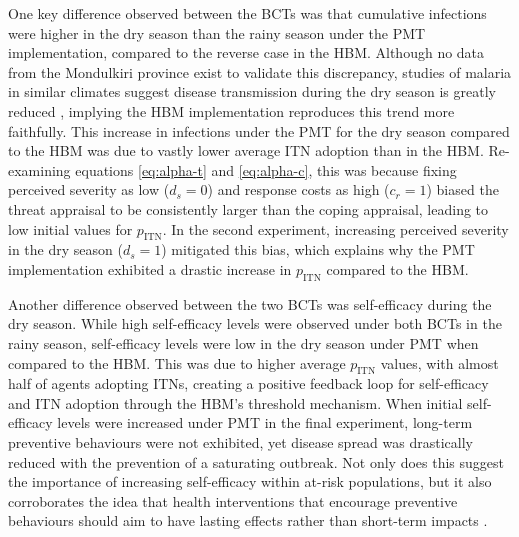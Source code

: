 One key difference observed between the BCTs was that cumulative infections were higher in the dry season than the rainy season under the PMT implementation, compared to the reverse case in the HBM. Although no data from the Mondulkiri province exist to validate this discrepancy, studies of malaria in similar climates suggest disease transmission during the dry season is greatly reduced \cite{stadler_evidence_2023}, implying the HBM implementation reproduces this trend more faithfully. This increase in infections under the PMT for the dry season compared to the HBM was due to vastly lower average ITN adoption than in the HBM. Re-examining equations \eqref{eq:alpha-t} and \eqref{eq:alpha-c}, this was because fixing perceived severity as low ($d_s=0$) and response costs as high ($c_r=1$) biased the threat appraisal to be consistently larger than the coping appraisal, leading to low initial values for $p_{\text{ITN}}$. In the second experiment, increasing perceived severity in the dry season ($d_s=1$) mitigated this bias, which explains why the PMT implementation exhibited a drastic increase in $p_{\text{ITN}}$ compared to the HBM.

Another difference observed between the two BCTs was self-efficacy during the dry season. While high self-efficacy levels were observed under both BCTs in the rainy season, self-efficacy levels were low in the dry season under PMT when compared to the HBM. This was due to higher average $p_{\text{ITN}}$ values, with almost half of agents adopting ITNs, creating a positive feedback loop for self-efficacy and ITN adoption through the HBM's threshold mechanism. When initial self-efficacy levels were increased under PMT in the final experiment, long-term preventive behaviours were not exhibited, yet disease spread was drastically reduced with the prevention of a saturating outbreak. Not only does this suggest the importance of increasing self-efficacy within at-risk populations, but it also corroborates the idea that health interventions that encourage preventive behaviours should aim to have lasting effects rather than short-term impacts \cite{tapia-conyer_community_2012}.


